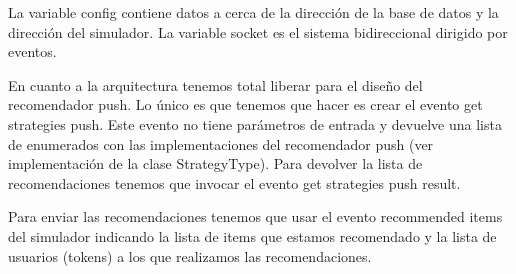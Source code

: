 La variable config contiene datos a cerca de la dirección de la base de datos y la dirección del simulador. La variable socket es el sistema bidireccional dirigido por eventos. 

En cuanto a la arquitectura tenemos total liberar para el diseño del recomendador push. Lo único es que tenemos que hacer es crear el evento get strategies push. Este evento no tiene parámetros de entrada y devuelve una lista de enumerados con las implementaciones del recomendador push (ver implementación de la clase StrategyType). Para devolver la lista de recomendaciones tenemos que invocar el evento get strategies push result.

Para enviar las recomendaciones tenemos que usar el evento recommended items del simulador indicando la lista de items que estamos recomendado y la lista de usuarios (tokens) a los que realizamos las recomendaciones.
